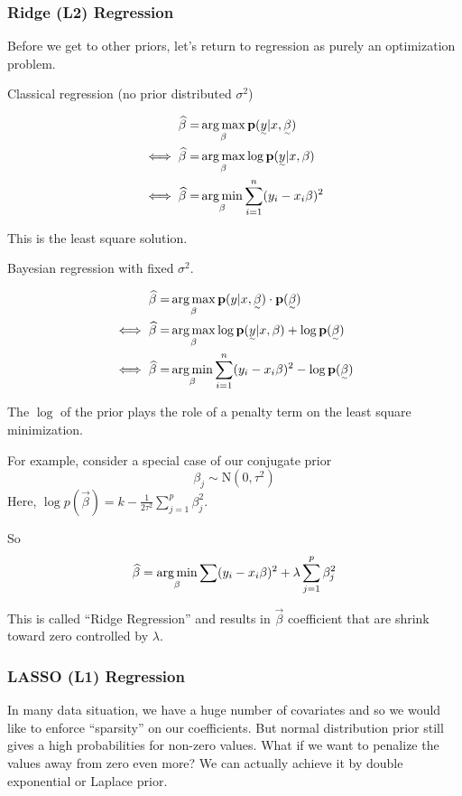\subsubsection{Ridge (L2) Regression}
Before we get to other priors, let's return to regression as purely an optimization problem.

Classical regression (no prior distributed $\sigma^2$)

\begin{align*}
    \hat{\beta} 
    =& \argmax_{\beta} \p(\vec{y}|x, \Vec{\beta})\\
    \iff \hat{\beta} =& \argmax_{\beta} \log \p(\Vec{y}|x, \beta)\\
    \iff \hat{\beta} =& \argmin_{\beta} \sum_{i=1}^n(y_i - x_i\beta)^2
\end{align*}

This is the least square solution.

Bayesian regression with fixed $\sigma^2$.

\begin{align*}
    \hat{\beta} 
    =& \argmax_{\beta} \p(y|x, \Vec{\beta}) \cdot \p(\Vec{\beta})\\
    \iff \hat{\beta} =& \argmax_{\beta} \log \p(\Vec{y}|x, \beta) + \log \p(\Vec{\beta})\\
    \iff \hat{\beta} =& \argmin_{\beta} \sum_{i=1}^n(y_i - x_i\beta)^2 - \log \p(\Vec{\beta})
\end{align*}

The $\log$ of the prior plays the role of a penalty term on the least square minimization.

For example, consider a special case of our conjugate prior 
\[
\beta_j \sim \text{N}(0, \tau^2)
\]
Here, $\log p(\Vec{\beta}) = k - \frac{1}{2\tau^2} \sum_{j=1}^p \beta_j^2$.

So 
\[
\widehat \beta = \operatorname*{arg\,min}_{\beta} \sum(y_i - x_i \beta)^2 + \lambda \sum_{j=1}^p \beta_j^2
\]

This is called ``Ridge Regression'' and results in $\Vec{\beta}$ coefficient that are shrink toward zero controlled by $\lambda$.

\subsubsection{LASSO (L1) Regression}

In many data situation, we have a huge number of covariates and so we would like to enforce ``sparsity'' on our coefficients. But normal distribution prior still gives a high probabilities for non-zero values. What if we want to penalize the values away from zero even more? We can actually achieve it by double exponential or Laplace prior.

